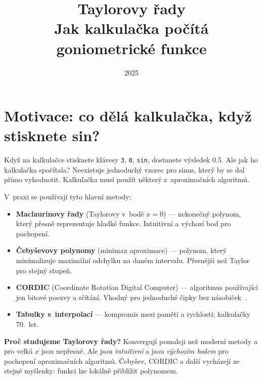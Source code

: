 \documentclass[12pt, a4paper]{article}
\title{Taylorovy řady\\[0.4em]
       \large Jak kalkulačka počítá goniometrické funkce}
\date{2025}
\begin{document}

\maketitle
\tableofcontents
\newpage

\section{Motivace: co dělá kalkulačka, když stisknete sin?}

Když na kalkulačce stisknete klávesy \texttt{3}, \texttt{0},
\texttt{sin}, dostanete výsledek \num{0.5}.
Ale jak ho kalkulačka spočítala?
Neexistuje jednoduchý vzorec pro sinus, který by se dal přímo vyhodnotit.
Kalkulačka musí použít některý z~aproximačních algoritmů.

V~praxi se používají tyto hlavní metody:

\begin{itemize}
    \item \textbf{Maclaurinovy řady} (Taylorovy v~bodě $x = 0$) ---
          nekonečný polynom, který přesně reprezentuje hladké funkce.
          Intuitivní a výchozí bod pro pochopení.
    \item \textbf{Čebyševovy polynomy} (minimax aproximace) ---
          polynom, který minimalizuje maximální odchylku na daném
          intervalu. Přesnější než Taylor pro stejný stupeň.
    \item \textbf{CORDIC} (Coordinate Rotation Digital Computer) ---
          algoritmus používající jen bitové posuvy a sčítání.
          Vhodný pro jednoduché čipky bez násobiček~\cite{volder1959}.
    \item \textbf{Tabulky s~interpolací} ---
          kompromis mezi pamětí a rychlostí; kalkulačky 70.~let.
\end{itemize}

\begin{notebox}
\textbf{Proč studujeme Taylorovy řady?}
Konvergují pomaleji než moderní metody a pro velká $x$ jsou nepřesné.
Ale jsou \emph{intuitivní} a jsou \emph{výchozím bodem} pro pochopení
aproximačních algoritmů. Čebyšev, CORDIC a další vycházejí ze stejné
myšlenky: funkci lze lokálně přiblížit polynomem.
\end{notebox}

\end{document}
